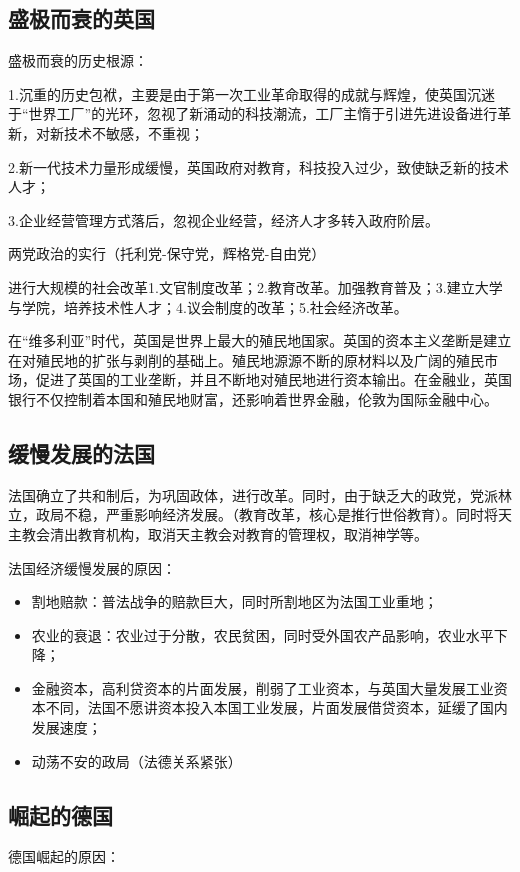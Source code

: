 \subsection{盛极而衰的英国}
盛极而衰的历史根源：

1.沉重的历史包袱，主要是由于第一次工业革命取得的成就与辉煌，使英国沉迷于“世界工厂”的光环，忽视了新涌动的科技潮流，工厂主惰于引进先进设备进行革新，对新技术不敏感，不重视；

2.新一代技术力量形成缓慢，英国政府对教育，科技投入过少，致使缺乏新的技术人才；

3.企业经营管理方式落后，忽视企业经营，经济人才多转入政府阶层。

两党政治的实行（托利党-保守党，辉格党-自由党）

进行大规模的社会改革1.文官制度改革；2.教育改革。加强教育普及；3.建立大学与学院，培养技术性人才；4.议会制度的改革；5.社会经济改革。

在“维多利亚”时代，英国是世界上最大的殖民地国家。英国的资本主义垄断是建立在对殖民地的扩张与剥削的基础上。殖民地源源不断的原材料以及广阔的殖民市场，促进了英国的工业垄断，并且不断地对殖民地进行资本输出。在金融业，英国银行不仅控制着本国和殖民地财富，还影响着世界金融，伦敦为国际金融中心。

\subsection{缓慢发展的法国}
法国确立了共和制后，为巩固政体，进行改革。同时，由于缺乏大的政党，党派林立，政局不稳，严重影响经济发展。（教育改革，核心是推行世俗教育）。同时将天主教会清出教育机构，取消天主教会对教育的管理权，取消神学等。

法国经济缓慢发展的原因：
\begin{itemize}
    \item 割地赔款：普法战争的赔款巨大，同时所割地区为法国工业重地；
    \item 农业的衰退：农业过于分散，农民贫困，同时受外国农产品影响，农业水平下降；
    \item 金融资本，高利贷资本的片面发展，削弱了工业资本，与英国大量发展工业资本不同，法国不愿讲资本投入本国工业发展，片面发展借贷资本，延缓了国内发展速度；
    \item 动荡不安的政局（法德关系紧张）
\end{itemize}

\subsection{崛起的德国}
德国崛起的原因：

